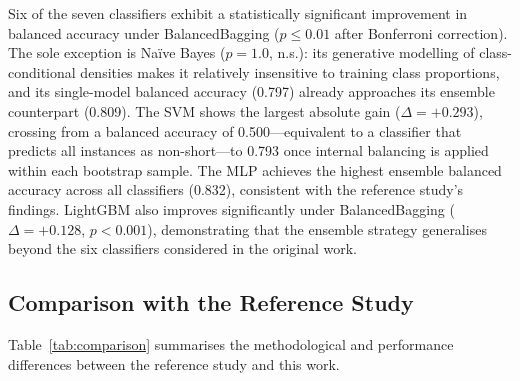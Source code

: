 \documentclass[a4paper,twoside]{article}
\begin{document}
Six of the seven classifiers exhibit a statistically significant improvement in
balanced accuracy under BalancedBagging ($p \leq 0.01$ after Bonferroni
correction). The sole exception is Naïve Bayes ($p = 1.0$, n.s.): its
generative modelling of class-conditional densities makes it relatively
insensitive to training class proportions, and its single-model balanced accuracy
(0.797) already approaches its ensemble counterpart (0.809). The SVM shows the
largest absolute gain ($\Delta = +0.293$), crossing from a balanced accuracy of
0.500---equivalent to a classifier that predicts all instances as non-short---to
0.793 once internal balancing is applied within each bootstrap sample. The MLP
achieves the highest ensemble balanced accuracy across all classifiers (0.832),
consistent with the reference study's findings. LightGBM also improves
significantly under BalancedBagging ($\Delta = +0.128$, $p < 0.001$),
demonstrating that the ensemble strategy generalises beyond the six classifiers
considered in the original work.

\subsection{Comparison with the Reference Study}

Table~\ref{tab:comparison} summarises the methodological and performance differences
between the reference study and this work.

\begin{table}[ht!]
  \centering
  \caption{Direct comparison between Papaiz et al.~\cite{Papaiz2024} and this work.
    \textsuperscript{a}Best ensemble balanced accuracy reported under repeated CV.
    \textsuperscript{b}Not reported in the reference study.}
  \label{tab:comparison}
\end{table}
\end{document}
